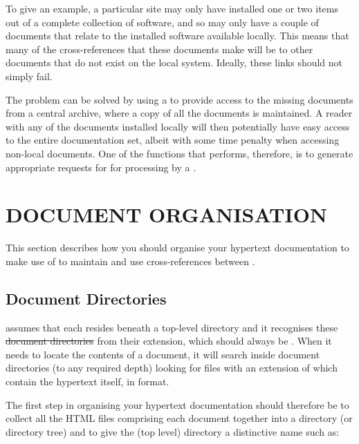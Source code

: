 To give an example, a particular site may only have installed one or
two items out of a complete collection of software, and so may only
have a couple of documents that relate to the installed software
available locally.  This means that many of the cross-references that
these documents make will be to other documents that do not exist on
the local system. Ideally, these links should not simply fail.

The problem can be solved by using a  to
provide access to the missing documents from a central archive, where
a copy of all the documents is maintained. A reader with any of the
documents installed locally will then potentially have easy access to
the entire documentation set, albeit with some time penalty when
accessing non-local documents. One of the functions that 
performs, therefore, is to generate appropriate requests for
 for processing by a 
.

\section{DOCUMENT ORGANISATION}

This section describes how you should organise your hypertext
documentation to make use of  to maintain and use
cross-references between .

\subsection{\label{sect:documentdirectories}Document Directories}

 assumes that each  resides
beneath a top-level directory and it recognises these \st{document
directories} from their extension, which should always be .
When it needs to locate the contents of a document, it will search
inside document directories (to any required depth) looking for files
with an extension of  which contain the hypertext itself, in
 format.

The first step in organising your hypertext documentation should
therefore be to collect all the HTML files comprising each document
together into a directory (or directory tree) and to give the (top
level) directory a distinctive name such as:

